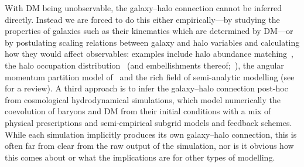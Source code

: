 \documentclass[useAMS,usenatbib]{mnras}
\begin{document}
With \ac{DM} being unobservable, the galaxy--halo connection cannot be inferred directly. Instead we are forced to do this either empirically---by studying the properties of galaxies such as their kinematics which are determined by \ac{DM}---or by postulating scaling relations between galaxy and halo variables and calculating how they would affect observables: examples include halo abundance matching~\citep{Kravtsov_2004,Behroozi_2010}, the halo occupation distribution~\citep{HOD} (and embellishments thereof;~\citealt{Paranjape_HOD, Decorated_HOD, Hadzhiyska_HOD}), the angular momentum partition model of~\cite{MMW_1998} and the rich field of semi-analytic modelling (see~\citealt{Baugh} for a review). A third approach is to infer the galaxy--halo connection post-hoc from cosmological hydrodynamical simulations, which model numerically the coevolution of baryons and \ac{DM} from their initial conditions with a mix of physical prescriptions and semi-empirical subgrid models and feedback schemes. While each simulation implicitly produces its own galaxy--halo connection, this is often far from clear from the raw output of the simulation, nor is it obvious how this comes about or what the implications are for other types of modelling.
\end{document}
